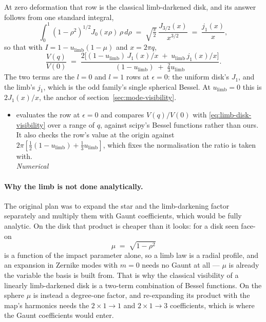 At zero deformation that row is the classical limb-darkened disk, and its answer follows from one
standard integral,
\begin{equation}
  \int_0^1 (1-\rho^{2})^{1/2} J_0(x\rho)\,\rho\,d\rho
  \;=\; \sqrt{\tfrac{\pi}{2}}\,\frac{J_{3/2}(x)}{x^{3/2}}
  \;=\; \frac{j_1(x)}{x} ,
  \label{eq:limb-disk-integral}
\end{equation}
so that with $I = 1 - u_\text{limb}(1-\mu)$ and $x = 2\pi q$,
\begin{equation}
  \frac{V(q)}{V(0)} \;=\;
  \frac{2\bigl[(1-u_\text{limb})\,J_1(x)/x \;+\; u_\text{limb}\,j_1(x)/x\bigr]}
       {(1-u_\text{limb}) \;+\; \tfrac23 u_\text{limb}} .
  \label{eq:limb-disk-visibility}
\end{equation}
The two terms are the $l = 0$ and $l = 1$ rows at $\epsilon = 0$: the uniform disk's $J_1$, and the
limb's $j_1$, which is the odd family's single spherical Bessel.  At $u_\text{limb} = 0$ this is
$2J_1(x)/x$, the anchor of section~\ref{sec:mode-visibility}.

\begin{itemize}
  \item[$\checkmark$]  evaluates the row at $\epsilon = 0$ and
    compares $V(q)/V(0)$ with \eqref{eq:limb-disk-visibility} over a range of $q$, against
    scipy's Bessel functions rather than ours.  It also checks the row's value at the origin
    against $2\pi[\tfrac12(1-u_\text{limb}) + \tfrac13u_\text{limb}]$, which fixes the
    normalisation the ratio is taken with.
    \\[1pt] \quad \emph{Numerical}
\end{itemize}

\paragraph{Why the limb is not done analytically.}  The original plan was to expand the star
and the limb-darkening factor separately and multiply them with Gaunt coefficients, which
would be fully analytic.  On the disk that product is cheaper than it looks: for a disk seen
face-on
\begin{equation}
  \mu \;=\; \sqrt{1-\rho^2}
  \label{eq:limb-mu-disk}
\end{equation}
is a function of the impact parameter alone, so a limb law is a radial profile, and an
expansion in Zernike modes with $m = 0$ needs no Gaunt at all --- $\mu$ is already the
variable the basis is built from.  That is why the classical visibility of a linearly
limb-darkened disk is a two-term combination of Bessel functions.  On the sphere $\mu$ is
instead a degree-one factor, and re-expanding its product with the map's harmonics needs the
$2\times1 \to 1$ and $2\times1 \to 3$ coefficients, which is where the Gaunt coefficients would
enter.

